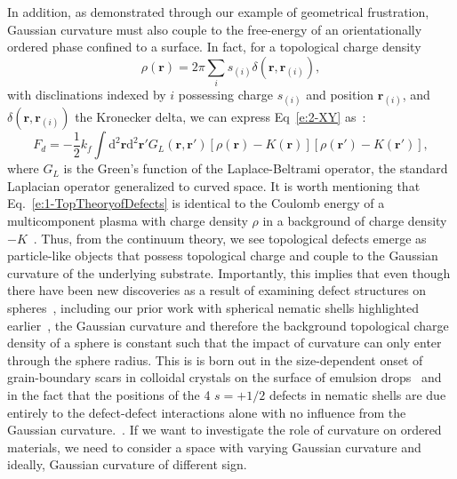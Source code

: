 In addition, as demonstrated through our example of geometrical frustration, Gaussian curvature must also couple to the free-energy of an orientationally ordered phase confined to a surface.
In fact, for a topological charge density
\begin{equation}
  \rho(\mathbf{r}) = 2 \pi \sum\limits_i s_{(i)}\delta(\mathbf{r},\mathbf{r}_(i)),
\end{equation}
with disclinations indexed by $i$ possessing charge $s_(i)$ and position $\mathbf{r}_(i)$, and $\delta(\mathbf{r},\mathbf{r}_(i))$ the Kronecker delta, we can express Eq~\ref{e:2-XY} as~\cite{RN42,RN175,RN17}:
\begin{equation}
  F_d = -\frac{1}{2} k_f \int \textrm{d}^2\mathbf{r}\textrm{d}^2\mathbf{r}' G_L(\mathbf{r},\mathbf{r}') [\rho(\mathbf{r})-K(\mathbf{r})] [\rho(\mathbf{r}')-K(\mathbf{r}')],\label{e:1-TopTheoryofDefects}
\end{equation}
where $G_L$ is the Green's function of the Laplace-Beltrami operator, the standard Laplacian operator generalized to curved space.
It is worth mentioning that Eq.~\ref{e:1-TopTheoryofDefects} is identical to the Coulomb energy of a multicomponent plasma with charge density $\rho$ in a background of charge density $-K$~\cite{RN17}.
Thus, from the continuum theory, we see topological defects emerge as particle-like objects that possess topological charge and couple to the Gaussian curvature of the underlying substrate.
Importantly, this implies that even though there have been new discoveries as a result of examining defect structures on spheres~\cite{RN106,RN26,RN110,RN76,RN101,RN165}, including our prior work with spherical nematic shells highlighted earlier~\cite{RN45,RN105}, the Gaussian curvature and therefore the background topological charge density of a sphere is constant such that the impact of curvature can only enter through the sphere radius.
This is is born out in the size-dependent onset of grain-boundary scars in colloidal crystals on the surface of emulsion drops~\cite{RN26,RN110} and in the fact that the positions of the 4 $s = +1/2$ defects in nematic shells are due entirely to the defect-defect interactions alone with no influence from the Gaussian curvature.~\cite{RN45}.
If we want to investigate the role of curvature on ordered materials, we need to consider a space with varying Gaussian curvature and ideally, Gaussian curvature of different sign.

